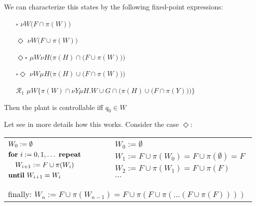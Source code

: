 \documentclass[table]{beamer}
\begin{document}
\begin{frame}
	We can characterize this states by the following fixed-point expressions:
	\begin{itemize}
		\item[$\square$] $\nu W \big( F \cap \pi(W)\big)$ 
		\item[$\Diamond$] $\nu W\big(F \cup \pi(W)\big)$ 
		\item[$\Diamond\square$] $\mu W \nu H\Big(\pi(H) \cap \big(F \cup \pi(W)\big)\Big)$
		\item[$\square\Diamond$] $\nu W \mu H\Big(\pi(H) \cup \big(F \cap \pi(W)\big)\Big)$
		\item[$\mathcal{R}_1$] $\mu W \Bigg\{\pi(W) \cap \nu Y \mu H . W \cup G \cap \Big(\pi(H) \cup \big(F \cap \pi(Y)\big)\Big)\Bigg\}$
	\end{itemize}
	Then the plant is controllable iff $q_0 \in W$
\end{frame}

\begin{frame}
	Let see in more details how this works. Consider the case $\Diamond$:
	\begin{table}[]
		\begin{tabular}{lll}
		$\begin{aligned}
			&W_0 := \emptyset \\
			&\textrm{\textbf{for} } i:=0,1,\ldots \textrm{ \textbf{repeat}} \\
			& \quad W_{i+1} := F \cup \pi(W_i) \\
			&\textrm{\textbf{until} } W_{i+1} = W_i\\
		\end{aligned}$
		& $\quad$ &
		$\begin{aligned}
			&W_0 := \emptyset \\
			&W_1 := F \cup \pi(W_0) = F \cup \pi(\emptyset) = F \\
			&W_2 := F \cup \pi(W_1) = F \cup \pi(F)\\
			& \ldots \\
		\end{aligned}$ \\
		&&\\%
		\multicolumn{3}{l}{finally: $W_n := F \cup \pi(W_{n-1}) = F \cup \pi(F \cup \pi(\ldots(F \cup \pi(F))))$}
		\end{tabular}
	\end{table}
\end{frame}
\end{document}
